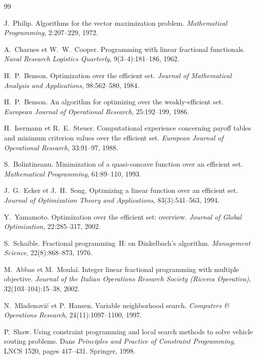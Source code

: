 \documentclass[11pt,a4paper]{article}
\theoremstyle{plain}
\theoremstyle{remark}
\begin{document}
\begin{thebibliography}{99}

J.~Philip.
\newblock Algorithms for the vector maximization problem.
\newblock \emph{Mathematical Programming}, 2:207--229, 1972.

A.~Charnes et W.~W.~Cooper.
\newblock Programming with linear fractional functionals.
\newblock \emph{Naval Research Logistics Quarterly}, 9(3--4):181--186, 1962.

H.~P.~Benson.
\newblock Optimization over the efficient set.
\newblock \emph{Journal of Mathematical Analysis and Applications},
  98:562--580, 1984.

H.~P.~Benson.
\newblock An algorithm for optimizing over the weakly-efficient set.
\newblock \emph{European Journal of Operational Research}, 25:192--199,
  1986.

H.~Isermann et R.~E.~Steuer.
\newblock Computational experience concerning payoff tables and minimum
  criterion values over the efficient set.
\newblock \emph{European Journal of Operational Research}, 33:91--97, 1988.

S.~Bolintineanu.
\newblock Minimization of a quasi-concave function over an efficient set.
\newblock \emph{Mathematical Programming}, 61:89--110, 1993.

J.~G.~Ecker et J.~H.~Song.
\newblock Optimizing a linear function over an efficient set.
\newblock \emph{Journal of Optimization Theory and Applications},
  83(3):541--563, 1994.

Y.~Yamamoto.
\newblock Optimization over the efficient set: overview.
\newblock \emph{Journal of Global Optimization}, 22:285--317, 2002.

S.~Schaible.
\newblock Fractional programming~II: on Dinkelbach's algorithm.
\newblock \emph{Management Science}, 22(8):868--873, 1976.

M.~Abbas et M.~Moulaï.
\newblock Integer linear fractional programming with multiple objective.
\newblock \emph{Journal of the Italian Operations Research Society
  (Ricerca Operativa)}, 32(103--104):15--38, 2002.

N.~Mladenović et P.~Hansen.
\newblock Variable neighborhood search.
\newblock \emph{Computers \& Operations Research}, 24(11):1097--1100, 1997.

P.~Shaw.
\newblock Using constraint programming and local search methods to solve
  vehicle routing problems.
\newblock Dans \emph{Principles and Practice of Constraint Programming},
  LNCS 1520, pages 417--431. Springer, 1998.


\end{thebibliography}
\end{document}
